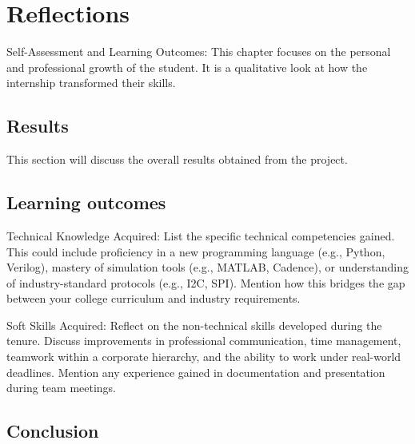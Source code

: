\chapter{Reflections}
Self-Assessment and Learning Outcomes: This chapter focuses on the personal and professional growth of the student. It is a qualitative look at how the internship transformed their skills.

\section{Results}
This section will discuss the overall results obtained from the project.

\section{Learning outcomes}
Technical Knowledge Acquired:
List the specific technical competencies gained. This could include proficiency in a new programming language (e.g., Python, Verilog), mastery of simulation tools (e.g., MATLAB, Cadence), or understanding of industry-standard protocols (e.g., I2C, SPI). Mention how this bridges the gap between your college curriculum and industry requirements.

Soft Skills Acquired:
Reflect on the non-technical skills developed during the tenure. Discuss improvements in professional communication, time management, teamwork within a corporate hierarchy, and the ability to work under real-world deadlines. Mention any experience gained in documentation and presentation during team meetings.

\section{Conclusion}
